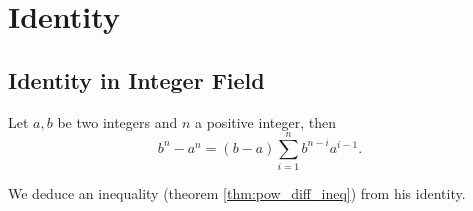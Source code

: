 \chapter{Identity}
\section{Identity in Integer Field}
\begin{thm}
\label{thm:pow_diff_eq}
Let $a, b$ be two integers and $n$ a positive integer, then
\begin{equation}
    b^n - a^n = (b - a) \sum_{i=1}^n b^{n-i}a^{i - 1}.
\end{equation}
\end{thm}
We deduce an inequality (theorem \ref{thm:pow_diff_ineq}) from his 
identity.